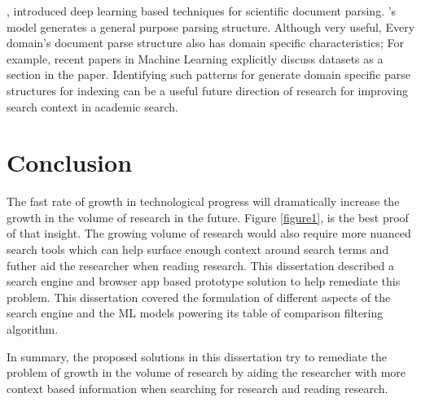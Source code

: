 \cite{kashyap2020sciwing}, introduced deep learning based techniques for scientific document parsing. \cite{kashyap2020sciwing}'s model generates a general purpose parsing structure. Although very useful, Every domain's document parse structure also has domain specific characteristics; For example, recent papers in Machine Learning explicitly discuss datasets as a section in the paper. Identifying such patterns for generate domain specific parse structures for indexing can be a useful future direction of research for improving search context in academic search.  

\section{Conclusion}
The fast rate of growth in technological progress will dramatically increase the growth in the volume of research in the future. Figure \ref{figure1}, is the best proof of that insight. The growing volume of research would also require more nuanced search tools which can help surface enough context around search terms and futher aid the researcher when reading research. This dissertation described a search engine and browser app based prototype solution to help remediate this problem. This dissertation covered the formulation of different aspects of the search engine and the ML models powering its table of comparison filtering algorithm. 

In summary, the proposed solutions in this dissertation try to remediate the problem of growth in the volume of research by aiding the researcher with more context based information when searching for research and reading research.